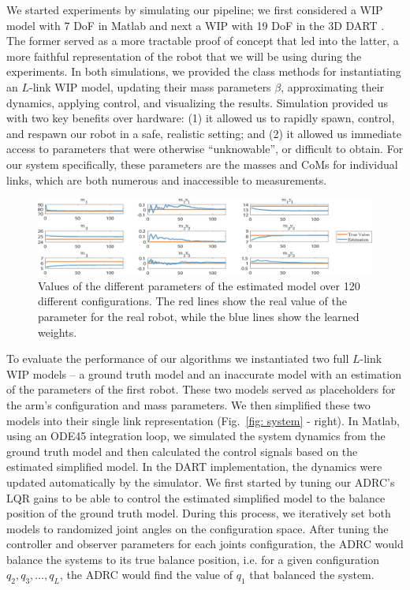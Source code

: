 \documentclass[letterpaper, 10 pt, conference]{ieeeconf}  %
\begin{document}
We started experiments by simulating our pipeline; we first considered a \ac{WIP} model with 7 DoF in Matlab and next a \ac{WIP} with 19 DoF in the 3D \ac{DART} \cite{DART}.  The former served as a more tractable proof of concept that led into the latter, a more faithful representation of the robot that we will be using during the experiments.  In both simulations, we provided the class methods for instantiating an $L$-link \ac{WIP} model, updating their mass parameters $\beta$, approximating their dynamics, applying control, and visualizing the results. Simulation provided us with two key benefits over hardware: (1) it allowed us to rapidly spawn, control, and respawn our robot in a safe, realistic setting; and (2) it allowed us immediate access to parameters that were otherwise ``unknowable'', or difficult to obtain.  For our system specifically, these parameters are the masses and \aclp{CoM} for individual links, which are both numerous and inaccessible to measurements.
\begin{figure}[!h]
\centering
\includegraphics[width=0.9\linewidth]{figs/Value3_fixed2.eps}
\vspace{-.5\baselineskip}
\caption{\label{fig:Values} Values of the different parameters of the estimated model over 120 different configurations. The red lines show the real value of the parameter for the real robot, while the blue lines show the learned weights.}
\end{figure}
To evaluate the performance of our algorithms we instantiated two full $L$-link \ac{WIP} models -- a ground truth model and an inaccurate model with an estimation of the parameters of the first robot. These two models served as placeholders for the arm's configuration and mass parameters. We then simplified these two models into their single link representation (Fig.~\ref{fig: system} - right). In Matlab, using an ODE45 integration loop, we simulated the system dynamics from the ground truth model and then calculated the control signals based on the estimated simplified model. In the \ac{DART} implementation, the dynamics were updated automatically by the simulator. We first started by tuning our \ac{ADRC}'s LQR gains to be able to control the estimated simplified model to the balance position of the ground truth model. During this process, we iteratively set both models to randomized joint angles on the configuration space. After tuning the controller and observer parameters for each joints configuration, the \ac{ADRC} would balance the systems to its true balance position, i.e. for a given configuration $q_2, q_3, \dots, q_L$, the \ac{ADRC} would find the value of $q_1$ that balanced the system.
\end{document}
